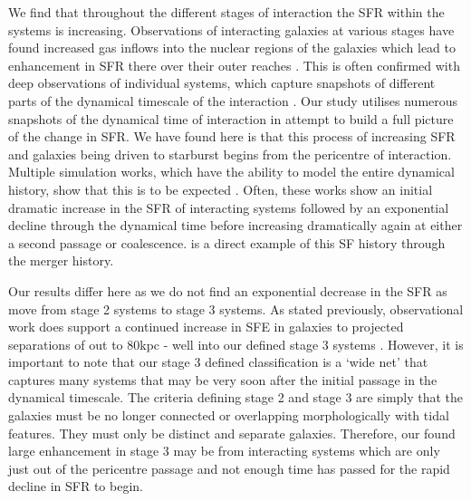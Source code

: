 \documentclass[fleqn,usenatbib]{mnras}
\begin{document}
We find that throughout the different stages of interaction the SFR within the systems is increasing. Observations of interacting galaxies at various stages have found increased gas inflows into the nuclear regions of the galaxies which lead to enhancement in SFR there over their outer reaches \citep{2015A&A...579A..45B}. This is often confirmed with deep observations of individual systems, which capture snapshots of different parts of the dynamical timescale of the interaction \citep{2022MNRAS.514.2769K}. Our study utilises numerous snapshots of the dynamical time of interaction in attempt to build a full picture of the change in SFR. We have found here is that this process of increasing SFR and galaxies being driven to starburst begins from the pericentre of interaction. Multiple simulation works, which have the ability to model the entire dynamical history, show that this is to be expected \citep{2007A&A...468...61D, 2013MNRAS.430.1901H, 2015MNRAS.452.2984K, 2021MNRAS.503.3113M}. Often, these works show an initial dramatic increase in the SFR of interacting systems followed by an exponential decline through the dynamical time before increasing dramatically again at either a second passage or coalescence. \citet{2015MNRAS.448.1107M} is a direct example of this SF history through the merger history.

Our results differ here as we do not find an exponential decrease in the SFR as move from stage 2 systems to stage 3 systems. As stated previously, observational work does support a continued increase in SFE in galaxies to projected separations of out to 80kpc - well into our defined stage 3 systems \citep[for further examples, see][]{2008MNRAS.385.1903L, 2012MNRAS.426..549S}. However, it is important to note that our stage 3 defined classification is a `wide net' that captures many systems that may be very soon after the initial passage in the dynamical timescale. The criteria defining stage 2 and stage 3 are simply that the galaxies must be no longer connected or overlapping morphologically with tidal features. They must only be distinct and separate galaxies. Therefore, our found large enhancement in stage 3 may be from interacting systems which are only just out of the pericentre passage and not enough time has passed for the rapid decline in SFR to begin. 
\end{document}
